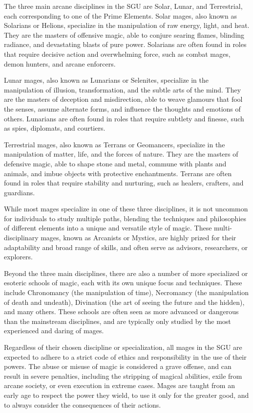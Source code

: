 \documentclass[12pt]{article}
\begin{document}
The three main arcane disciplines in the SGU are Solar, Lunar, and Terrestrial, each corresponding to one of the Prime Elements. Solar mages, also known as Solarians or Helions, specialize in the manipulation of raw energy, light, and heat. They are the masters of offensive magic, able to conjure searing flames, blinding radiance, and devastating blasts of pure power. Solarians are often found in roles that require decisive action and overwhelming force, such as combat mages, demon hunters, and arcane enforcers.

Lunar mages, also known as Lunarians or Selenites, specialize in the manipulation of illusion, transformation, and the subtle arts of the mind. They are the masters of deception and misdirection, able to weave glamours that fool the senses, assume alternate forms, and influence the thoughts and emotions of others. Lunarians are often found in roles that require subtlety and finesse, such as spies, diplomats, and courtiers.

Terrestrial mages, also known as Terrans or Geomancers, specialize in the manipulation of matter, life, and the forces of nature. They are the masters of defensive magic, able to shape stone and metal, commune with plants and animals, and imbue objects with protective enchantments. Terrans are often found in roles that require stability and nurturing, such as healers, crafters, and guardians.

While most mages specialize in one of these three disciplines, it is not uncommon for individuals to study multiple paths, blending the techniques and philosophies of different elements into a unique and versatile style of magic. These multi-disciplinary mages, known as Arcanists or Mystics, are highly prized for their adaptability and broad range of skills, and often serve as advisors, researchers, or explorers.

Beyond the three main disciplines, there are also a number of more specialized or esoteric schools of magic, each with its own unique focus and techniques. These include Chronomancy (the manipulation of time), Necromancy (the manipulation of death and undeath), Divination (the art of seeing the future and the hidden), and many others. These schools are often seen as more advanced or dangerous than the mainstream disciplines, and are typically only studied by the most experienced and daring of mages.

Regardless of their chosen discipline or specialization, all mages in the SGU are expected to adhere to a strict code of ethics and responsibility in the use of their powers. The abuse or misuse of magic is considered a grave offense, and can result in severe penalties, including the stripping of magical abilities, exile from arcane society, or even execution in extreme cases. Mages are taught from an early age to respect the power they wield, to use it only for the greater good, and to always consider the consequences of their actions.
\end{document}
